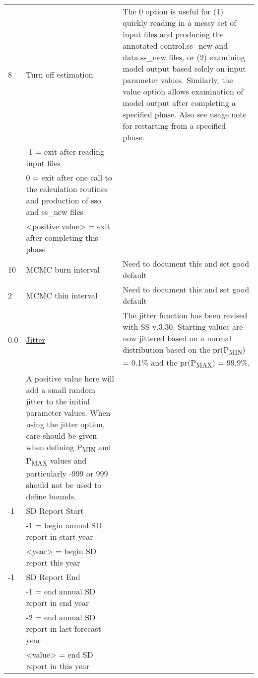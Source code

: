 {\begin{landscape}
\begin{longtable}{p{1.5cm} p{7cm} p{12.5cm}}
 \hline
 8 & Turn off estimation &  \multirow{1}{1cm}[-0.25cm]{\parbox{12.5cm}{The 0 option is useful for (1) quickly reading in a messy set of input files and producing the annotated control.ss\_new and data.ss\_new files, or (2) examining model output based solely on input parameter values.  Similarly, the value option allows examination of model output after completing a specified phase.  Also see usage note for restarting from a specified phase.}}\Tstrut\\
   & -1 = exit after reading input files & \\
   & 0 = exit after one call to the calculation routines and production of sso and ss\_new files & \\
   & <positive value> = exit after completing this phase & \\	  
	     
 \hline
 10 & MCMC burn interval & Need to document this and set good default \Tstrut\\
	   
 \hline
 2 & MCMC thin interval & Need to document this and set good default \Tstrut\\
	   
 \hline 
 0.0 & \hyperlink{Jitter}{Jitter} & \multirow{1}{1cm}[-0.25cm]{\parbox{12.5cm}{The jitter function has been revised with SS v.3.30.  Starting values are now jittered based on a normal distribution based on the pr(P\textsubscript{MIN}) = 0.1\% and the pr(P\textsubscript{MAX}) = 99.9\%.}}\Tstrut\\ 
	 & A positive value here will add a small random jitter to the initial parameter values.  When using the jitter option, care should be given when defining P\textsubscript{MIN} and P\textsubscript{MAX} values and particularly -999 or 999 should not be used to define bounds. & \\
	
 \hline
 -1 & SD Report Start & \Tstrut\\
    & -1 = begin annual SD report in start year & \\
    & <year> = begin SD report this year & \\
	      
 \hline
 -1 & SD Report End & \Tstrut\\
    & -1 = end annual SD report in end year & \\
    & -2 = end annual SD report in last forecast year & \\
    & <value> = end SD report in this year & \\
	   

\end{longtable}
\end{landscape}}

